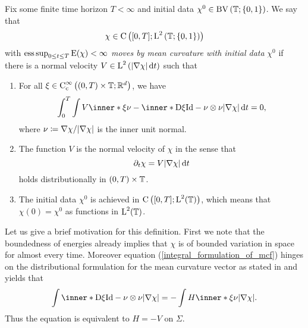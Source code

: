 \begin{definition}
	\label{motion_by_mcv}
	Fix some finite time horizon $ T < \infty $ and initial data $ \chi^{ 0 
	}\in \operatorname{BV} \left( \operatorname{\mathbb{T}} ; \{ 0 , 1 \} \right) $. We say that 
	\begin{equation*}
		\chi \in 
		\operatorname{C} \left(
		[ 0 , T ] ; \operatorname{L}^{ 2 } \left( \operatorname{\mathbb{T}} ; \{ 0 , 1 \}  \right)
		\right)
	\end{equation*}
	with $ \operatorname*{ess\,sup}_{ 0 \leq t \leq T } \operatorname{E} ( \chi ) < \infty $ \emph{moves 
	by mean 
	curvature with initial data } $ \chi^{ 0 } $ if there is a normal velocity
	$ V \in \operatorname{L}^{ 2 } \left( \abs{ \nabla \chi } \dd{ t } \right) $ such that 
	\begin{enumerate}
		\item 
		For all 
		$ \xi \in \operatorname{C}_{ \mathrm{ c } }^{ \infty } \left( ( 0 , T ) \times 
		\operatorname{\mathbb{T}} ; \mathbb{ R }^{ d } \right) $,
		we have
		\begin{equation}
			\label{integral_formulation_of_mcf}
			\int_{ 0 }^{ T }
			\int
			V \inner*{ \xi }{ \nu }
			- 
			\inner*{ \diff \xi }{ \mathrm{ Id } - \nu \otimes \nu }
			\abs{ \nabla \chi }
			\dd{ t }
			=
			0,
		\end{equation}
		where $ \nu \coloneqq \nabla \chi / \abs{ \nabla \chi } $ is the inner 
		unit normal.
		\item 
		The function $ V $ is the normal velocity of $ \chi $ in the sense that 
		\begin{equation*}
			\partial_{ t } \chi
			=
			V
			\abs{ \nabla \chi }
			\dd{ t }
		\end{equation*}
		holds distributionally in $ ( 0 , T ) \times \operatorname{\mathbb{T}} $.
		\item 
		The initial data $ \chi^{ 0 } $ is achieved in $ \operatorname{C} \left( [ 0 , T ] 
		; \operatorname{L}^{  2 } ( \operatorname{\mathbb{T}} ) \right) $, which means that $ \chi ( 
		0 ) = \chi^{ 0 } $ as functions in $ \operatorname{L}^{ 2 } ( \operatorname{\mathbb{T}} ) $.
	\end{enumerate}
\end{definition}

Let us give a brief motivation for this definition. First we note that the 
boundedness of energies already implies that $ \chi $ is of bounded variation 
in space for almost every time. Moreover equation 
(\ref{integral_formulation_of_mcf}) hinges on the distributional formulation 
for the mean curvature vector as stated in 
\cite[Thm.~11.8]{maggi_sets_of_finite_perimeter} and yields that
\begin{equation*}
	\int
		\inner*{ \diff \xi }{ \mathrm{Id} - \nu \otimes \nu }
	\abs{ \nabla \chi }
	=
	-
	\int
		H \inner*{ \xi }{ \nu }
	\abs{ \nabla \chi }.
\end{equation*}
Thus the equation is equivalent to $ H = - V $ on $ \Sigma $.

